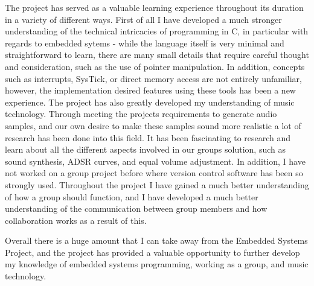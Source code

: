 The project has served as a valuable learning experience throughout its duration
in a variety of different ways. 
First of all I have developed a much stronger understanding of the technical 
intricacies of programming in C, in particular with regards to embedded sytems 
- while the language itself is very minimal and 
straightforward to learn, there are many small details that require careful 
thought and consideration, such as the use of pointer manipulation. 
In addition, concepts such as interrupts, SysTick, or direct memory access are 
not entirely unfamiliar, however, the implementation desired features using 
these tools has been a new experience.
The project has also greatly developed my understanding of music technology. 
Through meeting the projects requirements to generate audio samples, and our own 
desire to make these samples sound more realistic a lot of research has been done 
into this field. It has been fascinating to research and 
learn about all the different aspects involved in our groups solution, such as 
sound synthesis, ADSR curves, and equal volume adjustment. 
In addition, I have not worked on a group project before where version control 
software has been so strongly used. Throughout the project I have gained a much 
better understanding of how a group should function, and I have developed a much 
better understanding of the communication between group members and how 
collaboration works as a result of this.  
\par\bigskip\noindent
Overall there is a huge amount that I can take away from the Embedded Systems 
Project, and the project has provided a valuable opportunity to further develop 
my knowledge of embedded systems programming, working as a group, and music 
technology. 
